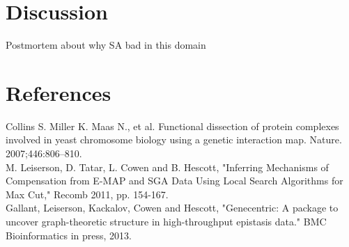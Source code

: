 \documentclass[11pt]{article}
\begin{document}
\section{Discussion}
Postmortem about why SA bad in this domain



\section{References}
Collins S. Miller K. Maas N., et al. Functional dissection of protein complexes involved in yeast chromosome biology using a genetic interaction map. Nature. 2007;446:806–810.\\

M. Leiserson, D. Tatar, L. Cowen and B. Hescott, "Inferring Mechanisms of Compensation from E-MAP and SGA Data Using Local Search Algorithms for Max Cut," Recomb 2011, pp. 154-167.\\

Gallant, Leiserson, Kackalov, Cowen and Hescott, "Genecentric: A package to uncover graph-theoretic structure in high-throughput epistasis data." BMC Bioinformatics in press, 2013.\\
\end{document}
